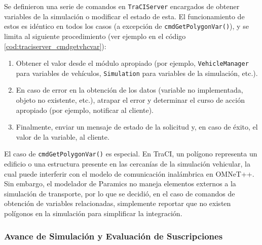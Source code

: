 

Se definieron una serie de comandos en \texttt{TraCIServer} encargados de obtener variables de la simulación o modificar el estado de esta. El funcionamiento de estos es idéntico en todos los casos (a excepción de \texttt{cmdGetPolygonVar()}), y se limita al siguiente procedimiento (ver ejemplo en el código \ref{cod:traciserver_cmdgetvhcvar}):

\begin{enumerate}
    \item Obtener el valor desde el módulo apropiado (por ejemplo, \texttt{VehicleManager} para variables de vehículos, \texttt{Simulation} para variables de la simulación, etc.).
    \item En caso de error en la obtención de los datos (variable no implementada, objeto no existente, etc.), atrapar el error y determinar el curso de acción apropiado (por ejemplo, notificar al cliente).
    \item Finalmente, enviar un mensaje de estado de la solicitud y, en caso de éxito, el valor de la variable, al cliente.
\end{enumerate}



El caso de \texttt{cmdGetPolygonVar()} es especial. En TraCI, un polígono representa un edificio o una estructura presente en las cercanías de la simulación vehicular, la cual puede interferir con el modelo de comunicación inalámbrica en OMNeT++. Sin embargo, el modelador de Paramics no maneja elementos externos a la simulación de transporte, por lo que se decidió, en el caso de comandos de obtención de variables relacionadas, simplemente reportar que no existen polígonos en la simulación para simplificar la integración.



\subsubsection{Avance de Simulación y Evaluación de Suscripciones}\label{sec:traciserver_simstep}

